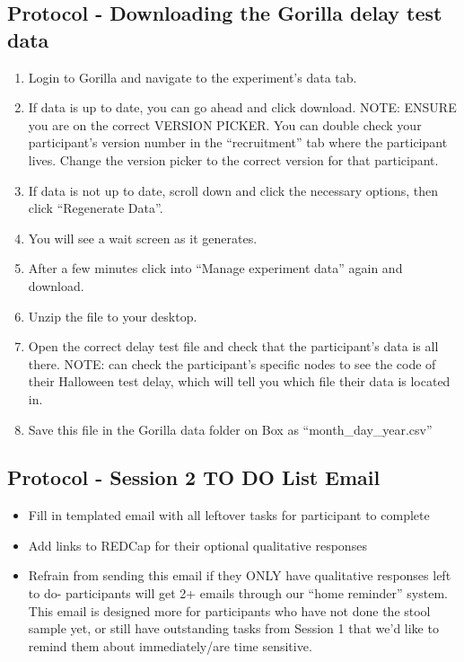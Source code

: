 \documentclass[]{book}
\begin{document}
\hypertarget{protocol---downloading-the-gorilla-delay-test-data-1}{%
\subsection{Protocol - Downloading the Gorilla delay test data}\label{protocol---downloading-the-gorilla-delay-test-data-1}}

\begin{enumerate}
\def\labelenumi{\arabic{enumi}.}
\item
  Login to Gorilla and navigate to the experiment's data tab.
\item
  If data is up to date, you can go ahead and click download. NOTE: ENSURE you are on the correct VERSION PICKER. You can double check your participant's version number in the ``recruitment'' tab where the participant lives. Change the version picker to the correct version for that participant.
\item
  If data is not up to date, scroll down and click the necessary options, then click ``Regenerate Data''.
\item
  You will see a wait screen as it generates.
\item
  After a few minutes click into ``Manage experiment data'' again and download.
\item
  Unzip the file to your desktop.
\item
  Open the correct delay test file and check that the participant's data is all there. NOTE: can check the participant's specific nodes to see the code of their Halloween test delay, which will tell you which file their data is located in.
\item
  Save this file in the Gorilla data folder on Box as ``month\_day\_year.csv''
\end{enumerate}

\hypertarget{protocol---session-2-to-do-list-email-1}{%
\subsection{Protocol - Session 2 TO DO List Email}\label{protocol---session-2-to-do-list-email-1}}

\begin{itemize}
\item
  Fill in templated email with all leftover tasks for participant to complete
\item
  Add links to REDCap for their optional qualitative responses
\item
  Refrain from sending this email if they ONLY have qualitative responses left to do- participants will get 2+ emails through our ``home reminder'' system. This email is designed more for participants who have not done the stool sample yet, or still have outstanding tasks from Session 1 that we'd like to remind them about immediately/are time sensitive.
\end{itemize}
\end{document}
